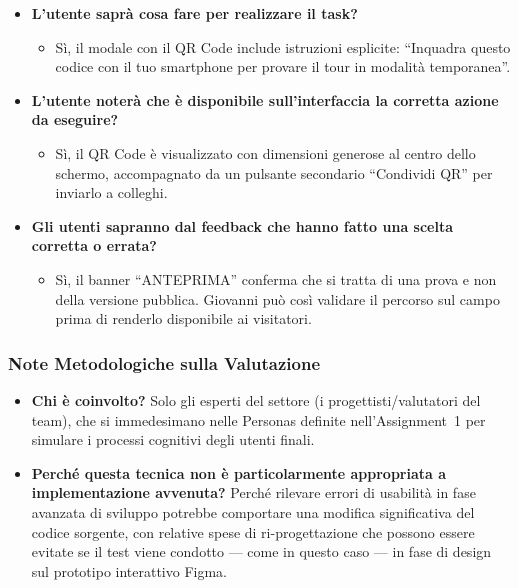 \begin{itemize}[nosep, leftmargin=1.6em]
    \item \textbf{L'utente saprà cosa fare per realizzare il task?}
    \begin{itemize}[nosep, leftmargin=1.6em]
        \item Sì, il modale con il QR Code include istruzioni esplicite: ``Inquadra questo codice con il tuo smartphone per provare il tour in modalità temporanea''.
    \end{itemize}
    \item \textbf{L'utente noterà che è disponibile sull'interfaccia la corretta azione da eseguire?}
    \begin{itemize}[nosep, leftmargin=1.6em]
        \item Sì, il QR Code è visualizzato con dimensioni generose al centro dello schermo, accompagnato da un pulsante secondario ``Condividi QR'' per inviarlo a colleghi.
    \end{itemize}
    \item \textbf{Gli utenti sapranno dal feedback che hanno fatto una scelta corretta o errata?}
    \begin{itemize}[nosep, leftmargin=1.6em]
        \item Sì, il banner ``ANTEPRIMA'' conferma che si tratta di una prova e non della versione pubblica. Giovanni può così validare il percorso sul campo prima di renderlo disponibile ai visitatori.
    \end{itemize}
\end{itemize}

\vspace{0.5cm}
\subsubsection{Note Metodologiche sulla Valutazione}

\begin{itemize}[leftmargin=1.6em]
    \item \textbf{Chi è coinvolto?} Solo gli esperti del settore (i progettisti/valutatori del team), che si immedesimano nelle Personas definite nell'Assignment~1 per simulare i processi cognitivi degli utenti finali.
    \item \textbf{Perché questa tecnica non è particolarmente appropriata a implementazione avvenuta?} Perché rilevare errori di usabilità in fase avanzata di sviluppo potrebbe comportare una modifica significativa del codice sorgente, con relative spese di ri-progettazione che possono essere evitate se il test viene condotto --- come in questo caso --- in fase di design sul prototipo interattivo Figma.
\end{itemize}

